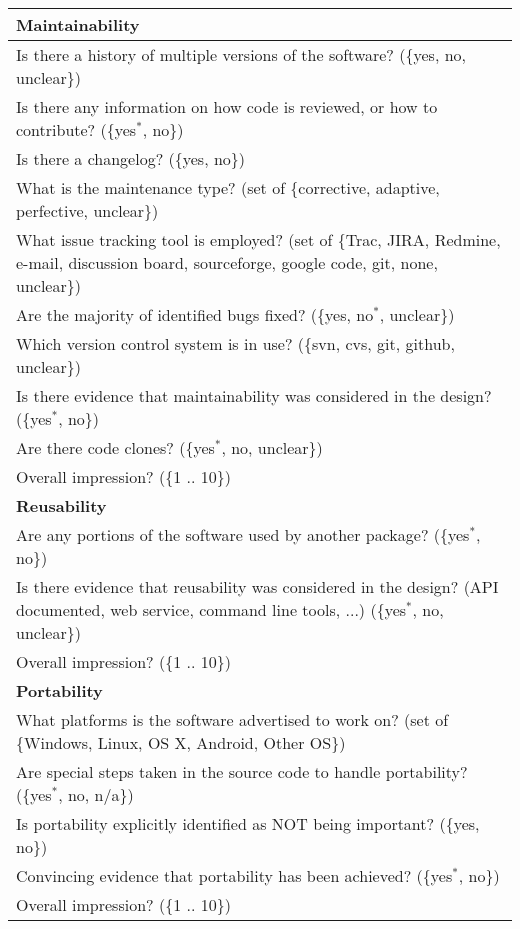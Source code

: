 \begin{longtable}{p{16cm}}
  \midrule
  \textbf{Maintainability}\\
  \midrule

  Is there a history of multiple versions of the software?  (\{yes, no, unclear\})\\
  Is there any information on how code is reviewed, or how to contribute?
  (\{yes$^*$, no\})\\
  Is there a changelog?  (\{yes, no\})\\
  What is the maintenance type? (set of \{corrective, adaptive, perfective, unclear\})\\
  What issue tracking tool is employed? (set of \{Trac, JIRA, Redmine, e-mail,
  discussion board, sourceforge, google code, git, none, unclear\})\\
  Are the majority of identified bugs fixed? (\{yes, no$^*$, unclear\})\\
  Which version control system is in use? (\{svn, cvs, git, github, unclear\})\\
  Is there evidence that maintainability was considered in the design?
  (\{yes$^*$, no\})\\
  Are there code clones? (\{yes$^*$, no, unclear\})\\
  Overall impression? (\{1 .. 10\})\\

  \midrule
  \textbf{Reusability}\\
  \midrule

  Are any portions of the software used by another package? (\{yes$^*$, no\})\\
  Is there evidence that reusability was considered in the design? (API
  documented, web service, command line tools, ...) (\{yes$^*$, no, unclear\})\\
  Overall impression? (\{1 .. 10\})\\

  \midrule
  \textbf{Portability}\\
  \midrule

  What platforms is the software advertised to work on?
  (set of \{Windows, Linux, OS X, Android, Other OS\})\\
  Are special steps taken in the source code to handle portability? (\{yes$^*$,
  no, n/a\}) \\
  Is portability explicitly identified as NOT being important? (\{yes, no\})\\
  Convincing evidence that portability has been achieved? (\{yes$^*$, no\})\\
  Overall impression? (\{1 .. 10\})\\


\end{longtable}
